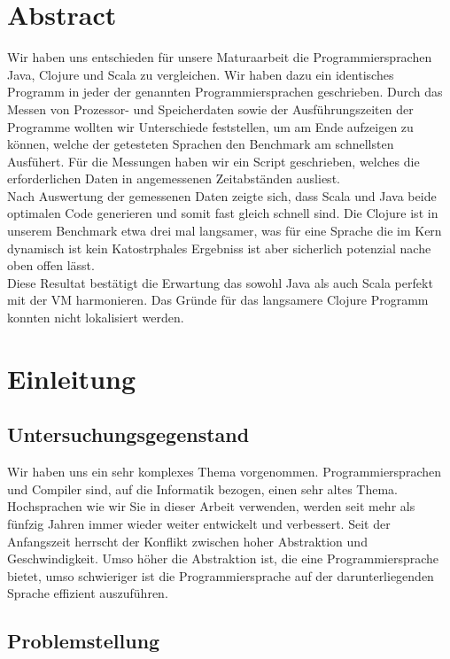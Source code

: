 \documentclass{fancydocument}
\begin{document}
\section{Abstract}
Wir haben uns entschieden für unsere Maturaarbeit die
Programmiersprachen Java, Clojure und Scala zu vergleichen. Wir haben
dazu ein identisches Programm in jeder der genannten
Programmiersprachen geschrieben. Durch das Messen von Prozessor- und
Speicherdaten sowie der Ausführungszeiten der Programme wollten wir
Unterschiede feststellen, um am Ende aufzeigen zu können, welche der
getesteten Sprachen den Benchmark am schnellsten Ausf\"uhert. Für die
Messungen haben wir ein Script geschrieben,
welches die erforderlichen Daten in angemessenen Zeitabständen
ausliest. 
\\
Nach Auswertung der gemessenen Daten zeigte sich, dass Scala
und Java beide optimalen Code generieren und somit fast gleich schnell
sind. Die Clojure ist in unserem Benchmark
etwa drei mal langsamer, was für eine Sprache die im Kern dynamisch
ist kein Katostrphales Ergebniss ist aber sicherlich potenzial nache
oben offen l\"asst. 
\\
Diese Resultat best\"atigt die Erwartung das
sowohl Java als auch Scala perfekt mit der VM harmonieren.
Das Gr\"unde f\"ur das langsamere Clojure Programm konnten nicht
lokalisiert werden. 


\section{Einleitung}

\subsection{Untersuchungsgegenstand}

Wir haben uns ein sehr komplexes Thema
vorgenommen. Programmiersprachen und Compiler sind, auf die Informatik
bezogen, einen sehr altes Thema. \\

Hochsprachen wie wir Sie in dieser Arbeit verwenden, werden seit mehr
als fünfzig Jahren immer wieder weiter entwickelt und verbessert. Seit
der Anfangszeit herrscht der Konflikt zwischen hoher Abstraktion und
Geschwindigkeit. Umso höher die Abstraktion ist, die eine
Programmiersprache bietet, umso schwieriger ist die Programmiersprache
auf der darunterliegenden Sprache effizient auszuführen.

\subsection{Problemstellung}
\end{document}
